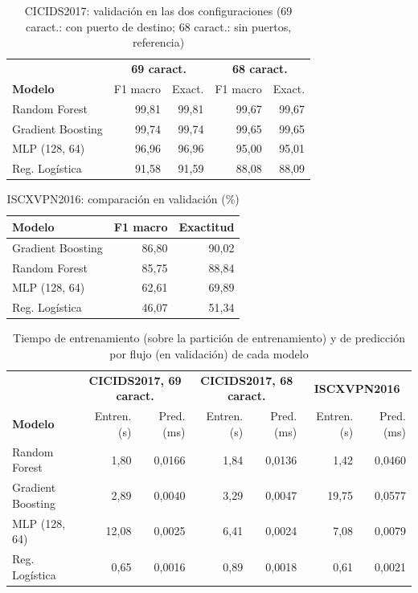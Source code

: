 \documentclass[conference]{IEEEtran}
\begin{document}
\begin{table}[!tb]
\centering
\footnotesize
\caption{CICIDS2017: validación en las dos configuraciones (69 caract.: con puerto de destino; 68 caract.: sin puertos, referencia)}
\label{tab:val_cicids}
\begin{tabular}{lrrrr}
\toprule
& \multicolumn{2}{c}{\textbf{69 caract.}} & \multicolumn{2}{c}{\textbf{68 caract.}} \\
\textbf{Modelo} & F1 macro & Exact. & F1 macro & Exact. \\
\midrule
Random Forest & 99,81 & 99,81 & 99,67 & 99,67 \\
Gradient Boosting & 99,74 & 99,74 & 99,65 & 99,65 \\
MLP (128, 64) & 96,96 & 96,96 & 95,00 & 95,01 \\
Reg. Logística & 91,58 & 91,59 & 88,08 & 88,09 \\
\bottomrule
\end{tabular}
\end{table}

\begin{table}[!tb]
\centering
\footnotesize
\caption{ISCXVPN2016: comparación en validación (\%)}
\label{tab:val_iscx}
\begin{tabular}{lrr}
\toprule
\textbf{Modelo} & \textbf{F1 macro} & \textbf{Exactitud} \\
\midrule
Gradient Boosting & 86,80 & 90,02 \\
Random Forest & 85,75 & 88,84 \\
MLP (128, 64) & 62,61 & 69,89 \\
Reg. Logística & 46,07 & 51,34 \\
\bottomrule
\end{tabular}
\end{table}

\begin{table}[!t]
\centering
\caption{Tiempo de entrenamiento (sobre la partición de entrenamiento) y de predicción por flujo (en validación) de cada modelo}
\label{tab:tiempos}
\small
\begin{tabular}{lrrrrrr}
\toprule
& \multicolumn{2}{c}{\textbf{CICIDS2017, 69 caract.}} & \multicolumn{2}{c}{\textbf{CICIDS2017, 68 caract.}} & \multicolumn{2}{c}{\textbf{ISCXVPN2016}} \\
\textbf{Modelo} & Entren. (s) & Pred. (ms) & Entren. (s) & Pred. (ms) & Entren. (s) & Pred. (ms) \\
\midrule
Random Forest & 1,80 & 0,0166 & 1,84 & 0,0136 & 1,42 & 0,0460 \\
Gradient Boosting & 2,89 & 0,0040 & 3,29 & 0,0047 & 19,75 & 0,0577 \\
MLP (128, 64) & 12,08 & 0,0025 & 6,41 & 0,0024 & 7,08 & 0,0079 \\
Reg. Logística & 0,65 & 0,0016 & 0,89 & 0,0018 & 0,61 & 0,0021 \\
\bottomrule
\end{tabular}
\end{table}
\end{document}
